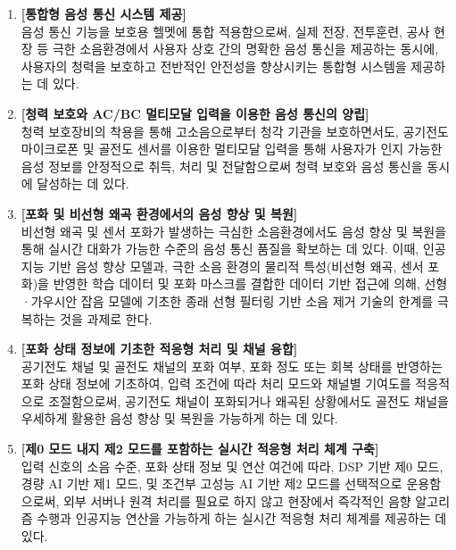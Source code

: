 \documentclass{article}
\begin{document}
\begin{enumerate}[label=(\alph*)]
    \item \textbf{[통합형 음성 통신 시스템 제공]}\\
    음성 통신 기능을 보호용 헬멧에 통합 적용함으로써, 실제 전장, 전투훈련, 공사 현장 등 극한 소음환경에서 사용자 상호 간의 명확한 음성 통신을 제공하는 동시에, 사용자의 청력을 보호하고 전반적인 안전성을 향상시키는 통합형 시스템을 제공하는 데 있다.

    \item \textbf{[청력 보호와 AC/BC 멀티모달 입력을 이용한 음성 통신의 양립]}\\
    청력 보호장비의 착용을 통해 고소음으로부터 청각 기관을 보호하면서도, 공기전도 마이크로폰 및 골전도 센서를 이용한 멀티모달 입력을 통해 사용자가 인지 가능한 음성 정보를 안정적으로 취득, 처리 및 전달함으로써 청력 보호와 음성 통신을 동시에 달성하는 데 있다.
    
    \item \textbf{[포화 및 비선형 왜곡 환경에서의 음성 향상 및 복원]}\\
    비선형 왜곡 및 센서 포화가 발생하는 극심한 소음환경에서도 음성 향상 및 복원을 통해 실시간 대화가 가능한 수준의 음성 통신 품질을 확보하는 데 있다. 이때, 인공지능 기반 음성 향상 모델과, 극한 소음 환경의 물리적 특성(비선형 왜곡, 센서 포화)을 반영한 학습 데이터 및 포화 마스크를 결합한 데이터 기반 접근에 의해, 선형·가우시안 잡음 모델에 기초한 종래 선형 필터링 기반 소음 제거 기술의 한계를 극복하는 것을 과제로 한다.

    \item \textbf{[포화 상태 정보에 기초한 적응형 처리 및 채널 융합]}\\
    공기전도 채널 및 골전도 채널의 포화 여부, 포화 정도 또는 회복 상태를 반영하는 포화 상태 정보에 기초하여, 입력 조건에 따라 처리 모드와 채널별 기여도를 적응적으로 조절함으로써, 공기전도 채널이 포화되거나 왜곡된 상황에서도 골전도 채널을 우세하게 활용한 음성 향상 및 복원을 가능하게 하는 데 있다.

    \item \textbf{[제0 모드 내지 제2 모드를 포함하는 실시간 적응형 처리 체계 구축]}\\
    입력 신호의 소음 수준, 포화 상태 정보 및 연산 여건에 따라, DSP 기반 제0 모드, 경량 AI 기반 제1 모드, 및 조건부 고성능 AI 기반 제2 모드를 선택적으로 운용함으로써, 외부 서버나 원격 처리를 필요로 하지 않고 현장에서 즉각적인 음향 알고리즘 수행과 인공지능 연산을 가능하게 하는 실시간 적응형 처리 체계를 제공하는 데 있다.
\end{enumerate}
\end{document}
